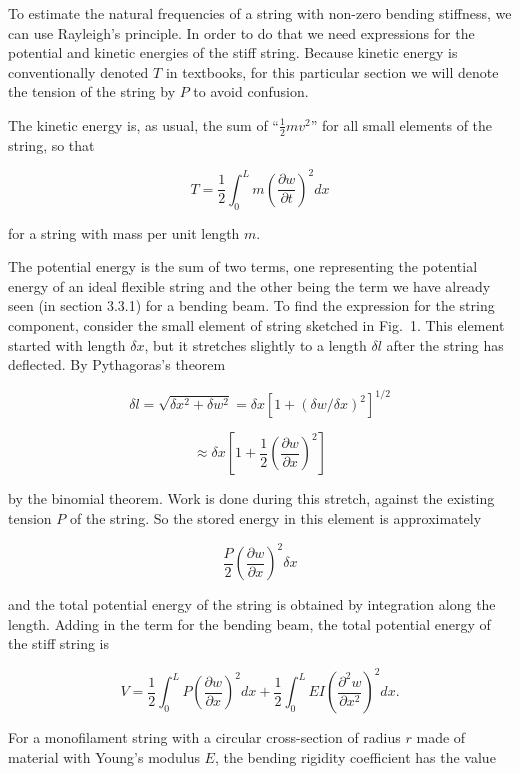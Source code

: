   To estimate the natural frequencies of a string with non-zero bending 
  stiffness, we can use Rayleigh's principle. In order to do that we need 
  expressions for the potential and kinetic energies of the stiff string. 
  Because kinetic energy is conventionally denoted $T$ in textbooks, for this 
  particular section we will denote the tension of the string by $P$ to avoid 
  confusion. 

  The kinetic energy is, as usual, the sum of ``$\frac{1}{2}m v^2$'' for all 
  small elements of the string, so that 

  $$T=\frac{1}{2}\int_0^L{m \left(\frac{\partial w}{\partial t}\right)^2} dx 
  \tag{1}$$ 

  for a string with mass per unit length $m$. 

  The potential energy is the sum of two terms, one representing the potential 
  energy of an ideal flexible string and the other being the term we have 
  already seen (in section 3.3.1) for a bending beam. To find the expression 
  for the string component, consider the small element of string sketched in 
  Fig.\ 1. This element started with length $\delta x$, but it stretches 
  slightly to a length $\delta l$ after the string has deflected. By 
  Pythagoras's theorem 

  $$\delta l = \sqrt{\delta x^2 + \delta w^2}=\delta x [1+(\delta w / \delta 
  x)^2]^{1/2}$$ 

  $$\approx \delta x \left[1+ \frac{1}{2}\left(\dfrac{\partial w}{\partial 
  x}\right)^2 \right]\tag{2}$$ 

  by the binomial theorem. Work is done during this stretch, against the 
  existing tension $P$ of the string. So the stored energy in this element is 
  approximately 

  $$\frac{P}{2}\left(\dfrac{\partial w}{\partial x}\right)^2 \delta x \tag{3}$$ 

  and the total potential energy of the string is obtained by integration along 
  the length. Adding in the term for the bending beam, the total potential 
  energy of the stiff string is 

  $$V=\frac{1}{2}\int_0^L{P \left(\frac{\partial w}{\partial x}\right)^2} dx + 
  \frac{1}{2}\int_0^L{E I \left(\frac{\partial^2 w}{\partial x^2}\right)^2} dx 
  . \tag{4}$$ 

  For a monofilament string with a circular cross-section of radius $r$ made of 
  material with Young's modulus $E$, the bending rigidity coefficient has the 
  value 

